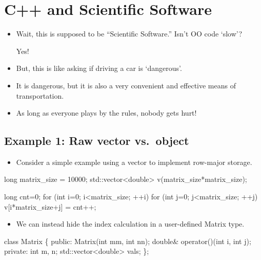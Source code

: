 \section{C++ and Scientific Software}


\begin{frame}[t]
  \begin{itemize}
    \itemsep=.75cm
  \item {Wait, this is supposed to be ``Scientific Software.'' Isn't OO code `slow'?
  {
    \begin{center}
      \large\alert{Yes!}
    \end{center}
  }
}
  \item<3-> {But, this is like asking if driving a car is `dangerous'.}
  \item<4-> {It is dangerous, but it is also a very convenient and effective means of transportation.}
  \item<5-> {As long as everyone plays by the rules, nobody gets hurt!}
  \end{itemize}
\end{frame}

\subsection*{Example 1: Raw vector vs.\ object }
\begin{frame}[fragile]%
  \begin{itemize}
  \item {Consider a simple example using a vector to implement row-major storage.}
  \end{itemize}
\small
\begin{semiverbatim}
long matrix_size = 10000;
std::vector<double> v(matrix_size*matrix_size);

long cnt=0;
for (int i=0; i<matrix_size; ++i)
  for (int j=0; j<matrix_size; ++j)
    v[\alert<2>{i*matrix_size+j}] = cnt++;
\end{semiverbatim}
\end{frame}


\begin{frame}[fragile]%
  \begin{itemize}
  \item {We can instead hide the index calculation in a user-defined Matrix type.}
  \end{itemize}
\small
\begin{semiverbatim}
class Matrix
\{
public:
  Matrix(int mm, int nn);
  double\& operator()(int i, int j);
private:
  int m, n;
  std::vector<double> vals;
\};
\end{semiverbatim}
\end{frame}


